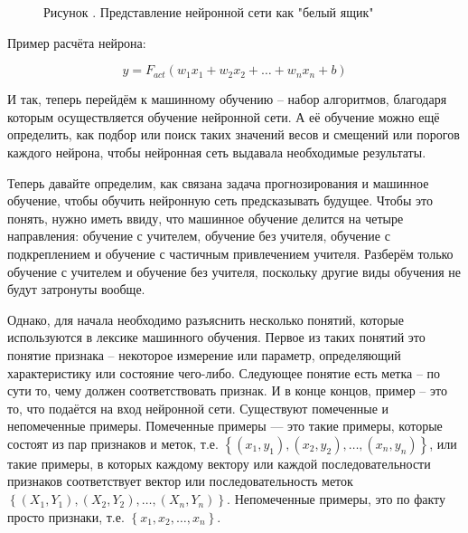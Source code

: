 {	\begin{figure}[H]
		\centering
		\def\svgwidth{\textwidth}
		
		\caption*{\gostFont Рисунок \thechaptercntr .\theimagecntr \spc {--} Представление нейронной сети как "белый ящик"}
		\label{fig:Neuron}
	\end{figure} \addtocounter{imagecntr}{1}
	
	\par \redline Пример расчёта нейрона:
	
	\begin{equation} \tag{\thechaptercntr .\theformulacntr}
		y = F_{act}\left(w_1x_1 + w_2x_2 + \dots + w_nx_n + b\right)
	\end{equation} \addtocounter{formulacntr}{1}
	
	\par \redline И так, теперь перейдём к машинному обучению – набор алгоритмов, благодаря которым осуществляется обучение нейронной сети. А её обучение можно ещё определить, как подбор или поиск таких значений весов и смещений или порогов каждого нейрона, чтобы нейронная сеть выдавала необходимые результаты. 
	
	\par \redline Теперь давайте определим, как связана задача прогнозирования и машинное обучение, чтобы обучить нейронную сеть предсказывать будущее. Чтобы это понять, нужно иметь ввиду, что машинное обучение делится на четыре направления: обучение с учителем, обучение без учителя, обучение с подкреплением и обучение с частичным привлечением учителя. Разберём только обучение с учителем и обучение без учителя, поскольку другие виды обучения не будут затронуты вообще. 
	
	\par \redline Однако, для начала необходимо разъяснить несколько понятий, которые используются в лексике машинного обучения. Первое из таких понятий это понятие признака – некоторое измерение или параметр, определяющий характеристику или состояние чего-либо. Следующее понятие есть метка – по сути то, чему должен соответствовать признак.  И в конце концов, пример – это то, что подаётся на вход нейронной сети. Существуют помеченные и непомеченные примеры. Помеченные примеры — это такие примеры, которые состоят из пар признаков и меток, т.е. $\left\{\left(x_{1}, y_{1}\right), \left(x_{2}, y_{2}\right), \dots, \left(x_{n}, y_{n}\right)\right\}$, или такие примеры, в которых каждому вектору или каждой последовательности признаков соответствует вектор или последовательность меток $\left\{\left(X_{1}, Y_{1}\right), \left(X_{2}, Y_{2}\right), \dots, \left(X_{n}, Y_{n}\right)\right\}$. Непомеченные примеры, это по факту просто признаки, т.е. $\left\{x_{1}, x_{2}, \dots, x_{n}\right\}$. 
	
}
